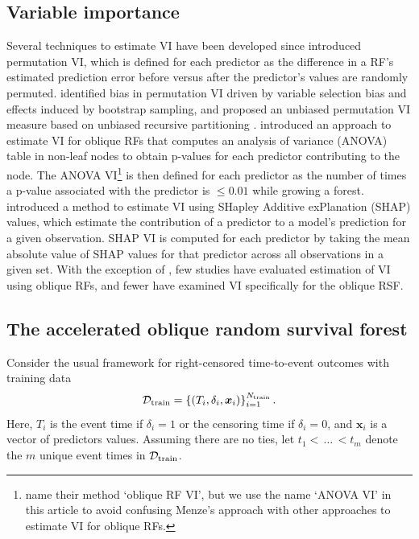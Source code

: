 \documentclass[12pt]{article}\usepackage[]{graphicx}\usepackage[]{xcolor}
\newcommand{\dataset}{{\cal D}}
\begin{document}
\subsection{Variable importance} \label{sec:rw_vi}

Several techniques to estimate VI have been developed since \citet{breiman2001random} introduced permutation VI, which is defined for each predictor as the difference in a RF's estimated prediction error before versus after the predictor's values are randomly permuted. \citet{strobl2007bias} identified bias in permutation VI driven by variable selection bias and effects induced by bootstrap sampling, and proposed an unbiased permutation VI measure based on unbiased recursive partitioning \citep{hothorn2006unbiased}. \citet{menze2011oblique} introduced an approach to estimate VI for oblique RFs that computes an analysis of variance (ANOVA) table in non-leaf nodes to obtain p-values for each predictor contributing to the node. The ANOVA VI\footnote{\citet{menze2011oblique} name their method `oblique RF VI', but we use the name `ANOVA VI' in this article to avoid confusing Menze's approach with other approaches to estimate VI for oblique RFs.} is then defined for each predictor as the number of times a p-value associated with the predictor is $\leq 0.01$ while growing a forest. \citet{lundberg2017unified} introduced a method to estimate VI using SHapley Additive exPlanation (SHAP) values, which estimate the contribution of a predictor to a model's prediction for a given observation. SHAP VI is computed for each predictor by taking the mean absolute value of SHAP values for that predictor across all observations in a given set. With the exception of \citet{menze2011oblique}, few studies have evaluated estimation of VI using oblique RFs, and fewer have examined VI specifically for the oblique RSF.


\subsection{The accelerated oblique random survival forest} \label{sec:aorsf}

Consider the usual framework for right-censored time-to-event outcomes with training data $$\dataset_{\text{train}} = \left\{ (T_i, \delta_i, \bm{x}_{i}) \right\}_{i=1}^{N_{\text{train}}}.$$ Here, $T_i$ is the event time if $\delta_i=1$ or the censoring time if $\delta_i=0$, and $\bm{x}_i$ is a vector of predictors values. Assuming there are no ties, let $t_1 < \, \ldots \, < t_m$ denote the $m$ unique event times in $\dataset_{\text{train}}$.
\end{document}
